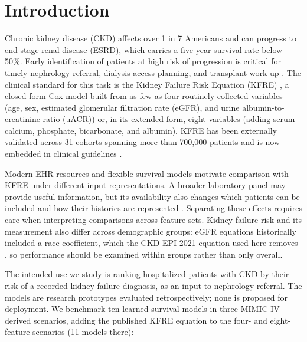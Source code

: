 
\section{Introduction}\label{Intro}

Chronic kidney disease (CKD) affects over 1 in 7 Americans \citep{CDC2023CKD} and can progress to end-stage renal disease (ESRD), which carries a five-year survival rate below 50\%. Early identification of patients at high risk of progression is critical for timely nephrology referral, dialysis-access planning, and transplant work-up \citep{levin2011early_detection}. The clinical standard for this task is the Kidney Failure Risk Equation (KFRE) \citep{tangri2011predicting}, a closed-form Cox model built from as few as four routinely collected variables (age, sex, estimated glomerular filtration rate (eGFR), and urine albumin-to-creatinine ratio (uACR)) or, in its extended form, eight variables (adding serum calcium, phosphate, bicarbonate, and albumin). KFRE has been externally validated across 31 cohorts spanning more than 700,000 patients \citep{tangri2016multinational} and is now embedded in clinical guidelines \citep{major2019kfre_external_validation}.

Modern EHR resources and flexible survival models motivate comparison with KFRE under different input representations. A broader laboratory panel may provide useful information, but its availability also changes which patients can be included and how their histories are represented \citep{ghosh2023machine_nomogram,kdigo2024}. Separating these effects requires care when interpreting comparisons across feature sets. Kidney failure risk and its measurement also differ across demographic groups: eGFR equations historically included a race coefficient, which the CKD-EPI 2021 equation used here removes \citep{inker2021ckdepi}, so performance should be examined within groups rather than only overall.

The intended use we study is ranking hospitalized patients with CKD by their risk of a recorded kidney-failure diagnosis, as an input to nephrology referral. The models are research prototypes evaluated retrospectively; none is proposed for deployment. We benchmark ten learned survival models in three MIMIC-IV-derived \citep{johnson2023mimic_ehr} scenarios, adding the published KFRE equation to the four- and eight-feature scenarios (11 models there):


